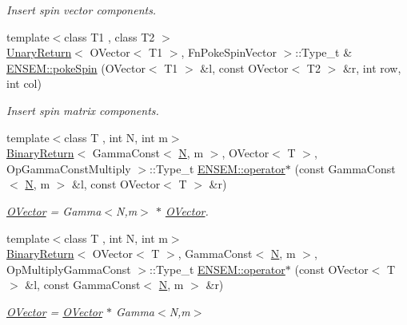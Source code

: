 \begin{DoxyCompactItemize}
\begin{DoxyCompactList}\small\item\em Insert spin vector components. \end{DoxyCompactList}\item 
{\footnotesize template$<$class T1 , class T2 $>$ }\\\mbox{\hyperlink{structUnaryReturn}{Unary\+Return}}$<$ O\+Vector$<$ T1 $>$, Fn\+Poke\+Spin\+Vector $>$\+::Type\+\_\+t \& \mbox{\hyperlink{group__obsvector_ga8b52874ec438b5bc2c6faef41097b352}{E\+N\+S\+E\+M\+::poke\+Spin}} (O\+Vector$<$ T1 $>$ \&l, const O\+Vector$<$ T2 $>$ \&r, int row, int col)
\begin{DoxyCompactList}\small\item\em Insert spin matrix components. \end{DoxyCompactList}\item 
{\footnotesize template$<$class T , int N, int m$>$ }\\\mbox{\hyperlink{structBinaryReturn}{Binary\+Return}}$<$ Gamma\+Const$<$ \mbox{\hyperlink{adat__devel_2lib_2hadron_2operator__name__util_8cc_a7722c8ecbb62d99aee7ce68b1752f337}{N}}, m $>$, O\+Vector$<$ T $>$, Op\+Gamma\+Const\+Multiply $>$\+::Type\+\_\+t \mbox{\hyperlink{group__obsvector_gaae51a4414b6efe2f47cc4c62841aabf9}{E\+N\+S\+E\+M\+::operator$\ast$}} (const Gamma\+Const$<$ \mbox{\hyperlink{adat__devel_2lib_2hadron_2operator__name__util_8cc_a7722c8ecbb62d99aee7ce68b1752f337}{N}}, m $>$ \&l, const O\+Vector$<$ T $>$ \&r)
\begin{DoxyCompactList}\small\item\em \mbox{\hyperlink{classENSEM_1_1OVector}{O\+Vector}} = Gamma$<$\+N,m$>$ $\ast$ \mbox{\hyperlink{classENSEM_1_1OVector}{O\+Vector}}. \end{DoxyCompactList}\item 
{\footnotesize template$<$class T , int N, int m$>$ }\\\mbox{\hyperlink{structBinaryReturn}{Binary\+Return}}$<$ O\+Vector$<$ T $>$, Gamma\+Const$<$ \mbox{\hyperlink{adat__devel_2lib_2hadron_2operator__name__util_8cc_a7722c8ecbb62d99aee7ce68b1752f337}{N}}, m $>$, Op\+Multiply\+Gamma\+Const $>$\+::Type\+\_\+t \mbox{\hyperlink{group__obsvector_ga4cead70d208b90a7a2b58aa6251d78b0}{E\+N\+S\+E\+M\+::operator$\ast$}} (const O\+Vector$<$ T $>$ \&l, const Gamma\+Const$<$ \mbox{\hyperlink{adat__devel_2lib_2hadron_2operator__name__util_8cc_a7722c8ecbb62d99aee7ce68b1752f337}{N}}, m $>$ \&r)
\begin{DoxyCompactList}\small\item\em \mbox{\hyperlink{classENSEM_1_1OVector}{O\+Vector}} = \mbox{\hyperlink{classENSEM_1_1OVector}{O\+Vector}} $\ast$ Gamma$<$\+N,m$>$ \end{DoxyCompactList}\item 

\end{DoxyCompactItemize}
